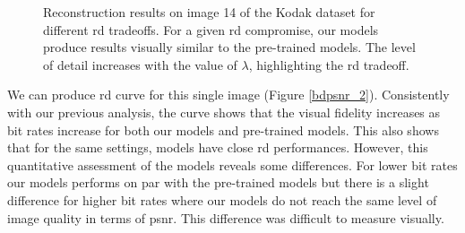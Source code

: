 \begin{figure}[H]
    \centering
    \caption[Reconstruction results on image 14 of the Kodak dataset for different \acrshort{rd} tradeoffs.]{Reconstruction results on image 14 of the Kodak dataset for different \acrshort{rd} tradeoffs. For a given \acrshort{rd} compromise, our models produce results visually similar to the pre-trained models. The level of detail increases with the value of \(\lambda\), highlighting the \acrshort{rd} tradeoff.}
    \label{bdpsnr_1}
\end{figure}

We can produce \acrshort{rd} curve for this single image (Figure \ref{bdpsnr_2}). Consistently with our previous analysis, the curve shows that the visual fidelity increases as bit rates increase for both our models and pre-trained models. This also shows that for the same settings, models have close \acrshort{rd} performances. However, this quantitative assessment of the models reveals some differences. For lower bit rates our models performs on par with the pre-trained models but there is a slight difference for higher bit rates where our models do not reach the same level of image quality in terms of \acrshort{psnr}. This difference was difficult to measure visually.

